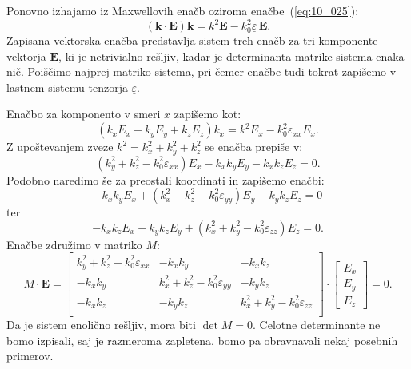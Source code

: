 Ponovno izhajamo iz Maxwellovih enačb oziroma enačbe~(\ref{eq:10_025}):
\begin{equation}
\left(\mathbf{k}\cdot \mathbf{E}\right)\mathbf{k} = 
k^2 \mathbf{E}- k_0^2\underline{\varepsilon}\,\mathbf{E}.
\label{eq:10_069}
\end{equation}
Zapisana vektorska enačba predstavlja sistem treh enačb za tri komponente vektorja $\mathbf{E}$, ki 
je netrivialno rešljiv, kadar je determinanta matrike sistema enaka nič. Poiščimo najprej
matriko sistema, pri čemer enačbe tudi tokrat zapišemo v lastnem sistemu tenzorja 
$\underline{\varepsilon}$.

Enačbo za komponento v smeri $x$ zapišemo kot:
\begin{equation}
(k_x E_x + k_yE_y+k_zE_z) k_x = k^2E_x-k_0^2\varepsilon_{xx}E_x.
\label{eq:10_070}
\end{equation}
Z upoštevanjem zveze $k^2 = k_x^2+k_y^2+k_z^2$ se enačba prepiše v:
\begin{equation}
(k_y^2+k_z^2 - k_0^2\varepsilon_{xx})E_x  - k_xk_yE_y - k_xk_zE_z = 0.
\label{eq:10_071}
\end{equation}
Podobno naredimo še za preostali koordinati in zapišemo enačbi:
\begin{equation}
- k_xk_yE_x + (k_x^2+k_z^2 - k_0^2\varepsilon_{yy})E_y  - k_yk_zE_z = 0
\label{eq:10_072}
\end{equation}
ter 
\begin{equation}
- k_xk_zE_x - k_yk_zE_y + (k_x^2+k_y^2  - k_0^2\varepsilon_{zz})E_z   = 0.
\label{eq:10_073}
\end{equation}
Enačbe združimo v matriko $M$:
\begin{equation}
M\cdot \mathbf{E}=
\left[\begin{array}{ccc}
k_y^2+k_z^2 - k_0^2\varepsilon_{xx} &  - k_xk_y & - k_xk_z\\
- k_xk_y & k_x^2+k_z^2 - k_0^2\varepsilon_{yy} &- k_yk_z\\
- k_xk_z & - k_yk_z & k_x^2+k_y^2  - k_0^2\varepsilon_{zz}\\
\end{array}\right] \cdot
\left[\begin{array}{c}
E_x \\
E_y \\
E_z
\end{array}\right]=0.
\label{eq:10_074}
\end{equation}
Da je sistem enolično rešljiv, mora biti $\det M=0$. Celotne determinante ne 
bomo izpisali, saj je razmeroma zapletena, bomo pa obravnavali nekaj posebnih primerov.

